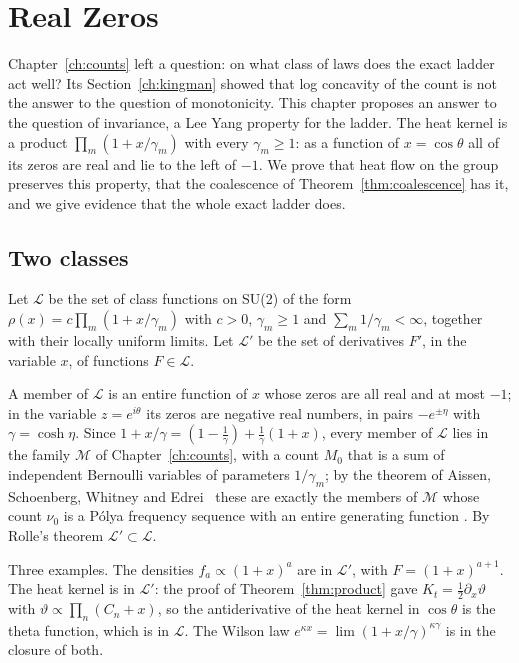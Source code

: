 \chapter{Real Zeros}\label{ch:zeros}

Chapter~\ref{ch:counts} left a question: on what class of laws does the exact ladder act well? Its Section~\ref{ch:kingman} showed that log concavity of the count is not the answer to the question of monotonicity. This chapter proposes an answer to the question of invariance, a Lee Yang property \cite{LY52} for the ladder. The heat kernel is a product $\prod_m(1+x/\gamma_m)$ with every $\gamma_m\ge1$: as a function of $x=\cos\theta$ all of its zeros are real and lie to the left of $-1$. We prove that heat flow on the group preserves this property, that the coalescence of Theorem~\ref{thm:coalescence} has it, and we give evidence that the whole exact ladder does.

\section{Two classes}\label{sec:twoclasses}

\begin{definition}
Let $\mathcal L$ be the set of class functions on SU(2) of the form $\rho(x)=c\prod_m(1+x/\gamma_m)$ with $c>0$, $\gamma_m\ge1$ and $\sum_m1/\gamma_m<\infty$, together with their locally uniform limits. Let $\mathcal L'$ be the set of derivatives $F'$, in the variable $x$, of functions $F\in\mathcal L$.
\end{definition}

A member of $\mathcal L$ is an entire function of $x$ whose zeros are all real and at most $-1$; in the variable $z=e^{i\theta}$ its zeros are negative real numbers, in pairs $-e^{\pm\eta}$ with $\gamma=\cosh\eta$. Since $1+x/\gamma=(1-\frac1\gamma)+\frac1\gamma(1+x)$, every member of $\mathcal L$ lies in the family $\mathcal M$ of Chapter~\ref{ch:counts}, with a count $M_0$ that is a sum of independent Bernoulli variables of parameters $1/\gamma_m$; by the theorem of Aissen, Schoenberg, Whitney and Edrei~\cite{Ed52} these are exactly the members of $\mathcal M$ whose count $\nu_0$ is a P\'olya frequency sequence with an entire generating function \cite{ASWE}. By Rolle's theorem $\mathcal L'\subset\mathcal L$.

Three examples. The densities $f_a\propto(1+x)^a$ are in $\mathcal L'$, with $F=(1+x)^{a+1}$. The heat kernel is in $\mathcal L'$: the proof of Theorem~\ref{thm:product} gave $K_t=\frac12\partial_x\vartheta$ with $\vartheta\propto\prod_n(C_n+x)$, so the antiderivative of the heat kernel in $\cos\theta$ is the theta function, which is in $\mathcal L$. The Wilson law $e^{\kappa x}=\lim(1+x/\gamma)^{\kappa\gamma}$ is in the closure of both.


